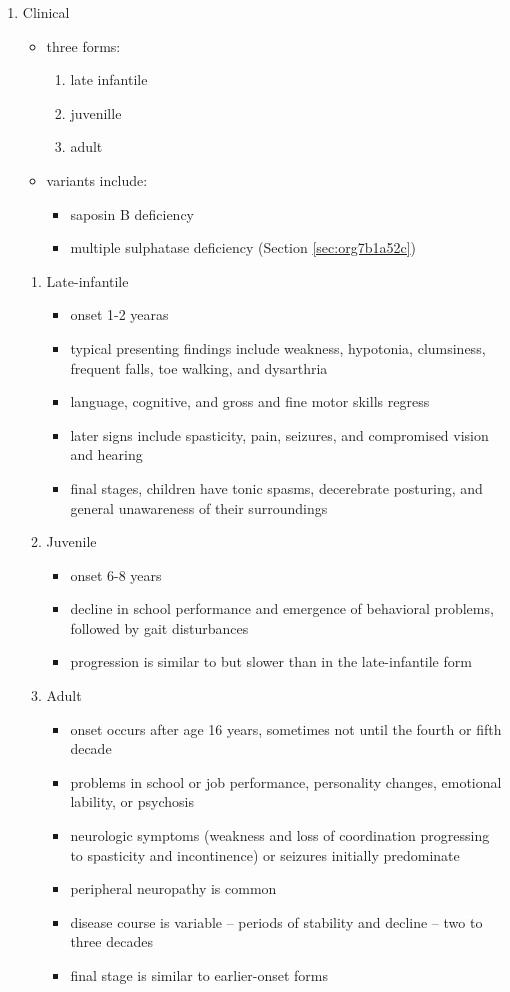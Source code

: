 \documentclass{scrartcl}
\begin{document}
\begin{enumerate}
\item Clinical
\label{sec:org14f0a5c}
\begin{itemize}
\item three forms:
\begin{enumerate}
\item late infantile
\item juvenille
\item adult
\end{enumerate}
\item variants include:
\begin{itemize}
\item saposin B deficiency
\item multiple sulphatase deficiency (Section \ref{sec:org7b1a52c})
\end{itemize}
\end{itemize}
\begin{enumerate}
\item Late-infantile
\label{sec:org245b886}
\begin{itemize}
\item onset 1-2 yearas
\item typical presenting findings include weakness, hypotonia, clumsiness, frequent falls, toe walking, and dysarthria
\item language, cognitive, and gross and fine motor skills regress
\item later signs include spasticity, pain, seizures, and compromised vision and hearing
\item final stages, children have tonic spasms, decerebrate posturing, and
general unawareness of their surroundings
\end{itemize}

\item Juvenile
\label{sec:org5b8b3ad}
\begin{itemize}
\item onset 6-8 years
\item decline in school performance and emergence of behavioral problems, followed by gait disturbances
\item progression is similar to but slower than in the late-infantile form
\end{itemize}

\item Adult
\label{sec:orgf5b9b3e}
\begin{itemize}
\item onset occurs after age 16 years, sometimes not until the fourth or fifth decade
\item problems in school or job performance, personality changes, emotional lability, or psychosis
\item neurologic symptoms (weakness and loss of coordination progressing
to spasticity and incontinence) or seizures initially
predominate
\item peripheral neuropathy is common
\item disease course is variable – periods of stability and decline – two to three decades
\item final stage is similar to earlier-onset forms
\end{itemize}
\end{enumerate}


\end{enumerate}
\end{document}
